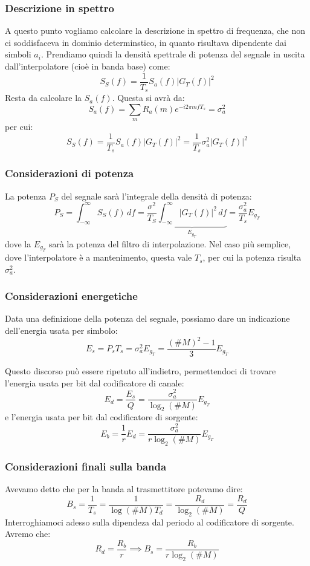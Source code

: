 \documentclass[a4paper,11pt]{article}
\begin{document}
\subsubsection{Descrizione in spettro}
A questo punto vogliamo calcolare la descrizione in spettro di frequenza, che non ci soddisfaceva in dominio determinstico, in quanto risultava dipendente dai simboli $a_i$. Prendiamo quindi la densità spettrale di potenza del segnale in uscita dall'interpolatore (cioè in banda base) come:
$$
S_S(f) = \frac{1}{T_s} S_a(f) | G_T(f) |^2
$$
Resta da calcolare la $S_a(f)$. Questa si avrà da:
$$
S_a(f) = \sum_m R_a(m) e^{-i 2 \pi m f T_s} = \sigma_a^2
$$
per cui:
$$
S_S(f) = \frac{1}{T_s} S_a(f) | G_T(f) |^2 = \frac{1}{T_s} \sigma_a^2 | G_T(f) |^2
$$

\subsubsection{Considerazioni di potenza}
La potenza $P_S$ del segnale sarà l'integrale della densità di potenza:
$$
P_S = \int_{-\infty}^{\infty} S_S(f) \, df = \frac{\sigma^2}{T_S} \underbrace{\int_{-\infty}^{\infty} | G_T(f) |^2 \, df}_{E_{g_T}} = \frac{\sigma_a^2}{T_s} E_{g_T}
$$
dove la $E_{g_T}$ sarà la potenza del filtro di interpolazione. Nel caso più semplice, dove l'interpolatore è a mantenimento, questa vale $T_s$, per cui la potenza risulta $\sigma_a^2$.

\subsubsection{Considerazioni energetiche}
Data una definizione della potenza del segnale, possiamo dare un indicazione dell'energia usata per simbolo: 
$$
E_s = P_s T_s = \sigma_a^2 E_{g_T} = \frac{(\# M)^2 - 1}{3} E_{g_T}
$$

Questo discorso può essere ripetuto all'indietro, permettendoci di trovare l'energia usata per bit dal codificatore di canale:
$$
E_d = \frac{E_s}{Q} = \frac{\sigma_a^2}{\log_2 (\# M)} E_{g_T}
$$
e l'energia usata per bit dal codificatore di sorgente:
$$
E_b = \frac{1}{r} E_d = \frac{\sigma_a^2}{r \log_2(\# M)} E_{g_T}
$$

\subsubsection{Considerazioni finali sulla banda}
Avevamo detto che per la banda al trasmettitore potevamo dire:
$$
B_s = \frac{1}{T_s} = \frac{1}{\log(\# M) T_d} = \frac{R_d}{\log_2 (\# M)} = \frac{R_d}{Q}
$$
Interroghiamoci adesso sulla dipendeza dal periodo al codificatore di sorgente. Avremo che:
$$
R_d = \frac{R_b}{r} \implies B_s = \frac{R_b}{r \log_2(\# M)}
$$
\end{document}
